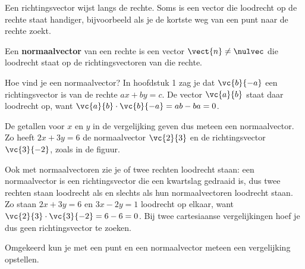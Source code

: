 Een richtingsvector wijst langs de rechte. Soms is een vector die loodrecht op de rechte staat handiger, bijvoorbeeld als je de kortste weg van een punt naar de rechte zoekt.

\begin{theorie}
Een \textbf{\textcolor{accent}{normaalvector}} van een rechte is een vector $\vect{n} \neq \nulvec$ die loodrecht staat op de richtingsvectoren van die rechte.
\end{theorie}

Hoe vind je een normaalvector? In hoofdstuk 1 zag je dat $\vc{b}{-a}$ een richtingsvector is van de rechte $ax + by = c$. De vector $\vc{a}{b}$ staat daar loodrecht op, want $\vc{a}{b} \cdot \vc{b}{-a} = ab - ba = 0$.


De getallen voor $x$ en $y$ in de vergelijking geven dus meteen een normaalvector. Zo heeft $2x + 3y = 6$ de normaalvector $\vc{2}{3}$ en de richtingsvector $\vc{3}{-2}$, zoals in de figuur.

Ook met normaalvectoren zie je of twee rechten loodrecht staan: een normaalvector is een richtingsvector die een kwartslag gedraaid is, dus twee rechten staan loodrecht als en slechts als hun normaalvectoren loodrecht staan. Zo staan $2x + 3y = 6$ en $3x - 2y = 1$ loodrecht op elkaar, want $\vc{2}{3} \cdot \vc{3}{-2} = 6 - 6 = 0$. Bij twee cartesiaanse vergelijkingen hoef je dus geen richtingsvector te zoeken.

Omgekeerd kun je met een punt en een normaalvector meteen een vergelijking opstellen.

